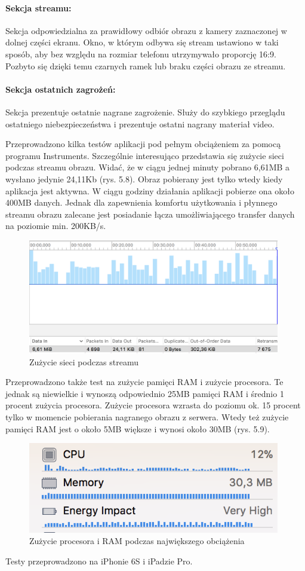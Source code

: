 \paragraph{Sekcja streamu:}
Sekcja odpowiedzialna za prawidłowy odbiór obrazu z kamery zaznaczonej w dolnej części ekranu. Okno, w którym odbywa się stream ustawiono w taki sposób, aby bez względu na rozmiar telefonu utrzymywało proporcję 16:9. Pozbyto się dzięki temu czarnych ramek lub braku części obrazu ze streamu.
\paragraph{Sekcja ostatnich zagrożeń:}
Sekcja prezentuje ostatnie nagrane zagrożenie. Służy do szybkiego przeglądu ostatniego niebezpieczeństwa i prezentuje ostatni nagrany materiał video. 

Przeprowadzono kilka testów aplikacji pod pełnym obciążeniem za pomocą programu Instruments. Szczególnie interesująco przedstawia się zużycie sieci podczas streamu obrazu. Widać, że w ciągu jednej minuty pobrano 6,61MB a wysłano jedynie 24,11Kb (rys. 5.8). Obraz pobierany jest tylko wtedy kiedy aplikacja jest aktywna. W ciągu godziny działania aplikacji pobierze ona około 400MB danych. Jednak dla zapewnienia komfortu użytkowania i płynnego streamu obrazu zalecane jest posiadanie łącza umożliwiającego transfer danych na poziomie min. 200KB/s. 
\begin{figure}[ht]
	\centering
	\includegraphics[width=11cm]{ios_screenshots/networkUsage.png}
	\caption{Zużycie sieci podczas streamu}
\end{figure}
Przeprowadzono także test na zużycie pamięci RAM i zużycie procesora. Te jednak są niewielkie i wynoszą odpowiednio 25MB pamięci RAM i średnio 1 procent zużycia procesora.
Zużycie procesora wzrasta do poziomu ok. 15 procent tylko w momencie pobierania nagranego obrazu z serwera. Wtedy też zużycie pamięci RAM jest o około 5MB większe i wynosi około 30MB (rys. 5.9).
\begin{figure}[ht]
	\centering
	\includegraphics[width=11cm]{ios_screenshots/CPURAM.png}
	\caption{Zużycie procesora i RAM podczas największego obciążenia}
\end{figure}
Testy przeprowadzono na iPhonie 6S i iPadzie Pro.


